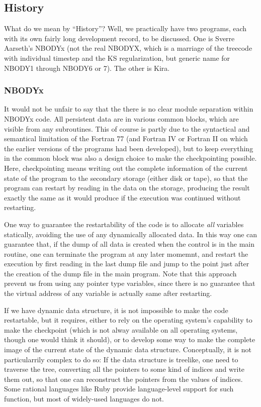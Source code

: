 \documentclass{article}[12pt]
\begin{document}
\subsection{History}

What do we mean by ``History''? Well, we practically have two
programs, each with its own fairly long development record, to be
discussed. One is Sverre Aarseth's NBODYx (not the real NBODYX, which
is a marriage of the treecode with individual timestep and the KS
regularization, but generic name for NBODY1 through NBODY6 or 7). The
other is Kira.

\subsubsection{NBODYx}

It would not be unfair to say that the there is no clear module
separation within NBODYx code. All persistent data are in various
common blocks, which are visible from any subroutines. This of course
is partly due to the syntactical and semantical limitation of the
Fortran 77 (and Fortran IV or Fortran II on which the earlier versions
of the programs had been developed), but to keep everything in the
common block was also a design choice to make the checkpointing
possible. Here, checkpointing means writing out the complete
information of the current state of the program to the secondary
storage (either disk or tape), so that the program can restart by
reading in the data on the storage, producing the result exactly the
same as it would produce if the execution was continued without
restarting.

One way to guarantee the restartability of the code is to allocate
{\it all} variables statically, avoiding the use of any dynamically
allocated data. In this way one can guarantee that, if the dump of all
data is created when the control is in the main routine, one can
terminate the program at any later momemnt, and restart the execution
by first reading in the last dump file and jump to the point just
after the creation of the dump file in the main program. Note that
this approach prevent us from using any pointer type variables, since
there is no guarantee that the virtual address of any variable is
actually same after restarting.

If we have dynamic data structure, it is not impossible to make the
code restartable, but it requires, either to rely on the operating
system's capability to make the checkpoint (which is not alway
available on all operating systems, though one would think it
should), or to develop some way to make the complete image of the
current state of the dynamic data structure. Conceptually, it is not
particularrily complex to do so: If the data structure is treelike,
one need to traverse the tree, converting all the pointers to some
kind of indices and write them out, so that one can reconstruct the
pointers  from the values of indices. Some rational languages like
Ruby provide language-level support for such function, but most of
widely-used languages do not.
\end{document}
